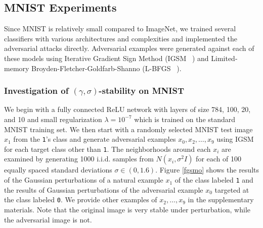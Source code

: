 \subsection{MNIST Experiments}

Since MNIST is relatively small compared to ImageNet, we trained several classifiers with various architectures and complexities and implemented the adversarial attacks directly. Adversarial examples were generated against each of these models using Iterative Gradient Sign Method (IGSM ~\cite{kurakin_adversarial_2016}) and Limited-memory Broyden-Fletcher-Goldfarb-Shanno (L-BFGS ~\cite{liu1989limited}).


 

\subsubsection{Investigation of $(\gamma, \sigma)$-stability on MNIST}\label{sec:mnist}

We begin with a fully connected ReLU network with layers of size 784, 100, 20, and 10 and small regularization $\lambda = 10^{-7}$ which is trained on the standard MNIST training set. We then start with a randomly selected MNIST test image $x_1$ from the \texttt{1}'s class and generate adversarial examples $x_0,x_2,\dots,x_9$ using IGSM for each target class other than \texttt{1}. The neighborhoods around each $x_i$ are examined by generating 1000 i.i.d. samples from $N(x_i,\sigma^2I)$ for each of 100 equally spaced standard deviations $\sigma\in(0,1.6)$. Figure \ref{fgsmo} shows the results of the Gaussian perturbations of a natural example $x_1$ of the class labeled \texttt{1} and the results of Gaussian perturbations of the adversarial example $x_0$ targeted at the class labeled \texttt{0}. We provide other examples of $x_2,\ldots,x_9$ in the supplementary materials. Note that the original image is very stable under perturbation, while the adversarial image is not. 



